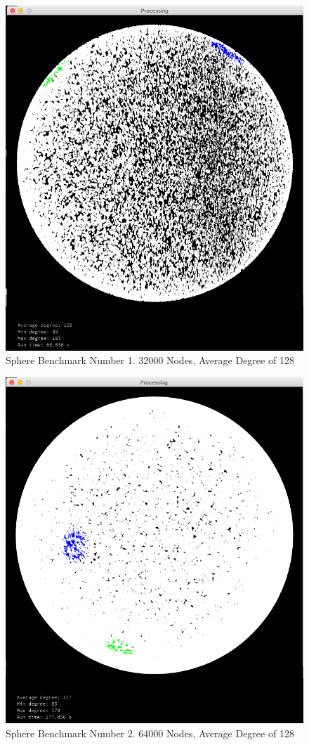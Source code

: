\documentclass{article}
\begin{document}
\begin{center}
    \begin{figure}
        \includegraphics[scale=0.45]{./images/sphere_1.png}
        \caption{Sphere Benchmark Number 1. 32000 Nodes, Average Degree of 128}
        \label{sphere1}
    \end{figure}
\end{center}

\begin{center}
    \begin{figure}
        \includegraphics[scale=0.45]{./images/sphere_2.png}
        \caption{Sphere Benchmark Number 2. 64000 Nodes, Average Degree of 128}
        \label{sphere2}
    \end{figure}
\end{center}
\end{document}

